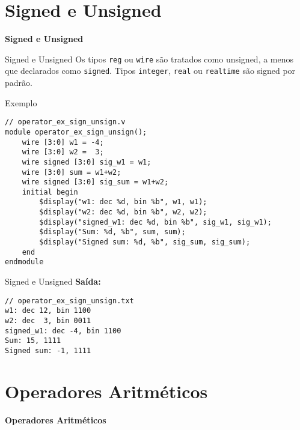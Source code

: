 \documentclass[aspectratio=169,xcolor=dvipsnames]{beamer}
\begin{document}
\section{Signed e Unsigned}

\begin{frame}
    \Huge{\centerline{\textbf{Signed e Unsigned}}}
\end{frame}

\begin{frame}[fragile]{Signed e Unsigned}
\scriptsize{Os tipos \texttt{reg} ou \texttt{wire} são tratados como unsigned, a menos que declarados como \texttt{signed}. Tipos \texttt{integer}, \texttt{real} ou \texttt{realtime} são signed por padrão.}

\begin{block}{Exemplo}
\begin{verbatim}
// operator_ex_sign_unsign.v
module operator_ex_sign_unsign();
    wire [3:0] w1 = -4;
    wire [3:0] w2 =  3;
    wire signed [3:0] sig_w1 = w1;
    wire [3:0] sum = w1+w2;
    wire signed [3:0] sig_sum = w1+w2; 
    initial begin
        $display("w1: dec %d, bin %b", w1, w1);
        $display("w2: dec %d, bin %b", w2, w2);
        $display("signed_w1: dec %d, bin %b", sig_w1, sig_w1);
        $display("Sum: %d, %b", sum, sum);
        $display("Signed sum: %d, %b", sig_sum, sig_sum);
    end
endmodule
\end{verbatim}
\end{block}
\end{frame}
\begin{frame}[fragile]{Signed e Unsigned}
\textbf{Saída:}
\begin{verbatim}
// operator_ex_sign_unsign.txt
w1: dec 12, bin 1100
w2: dec  3, bin 0011
signed_w1: dec -4, bin 1100
Sum: 15, 1111
Signed sum: -1, 1111
\end{verbatim}
\end{frame}

\section{Operadores Aritméticos}

\begin{frame}
    \Huge{\centerline{\textbf{Operadores Aritméticos}}}
\end{frame}
\end{document}
